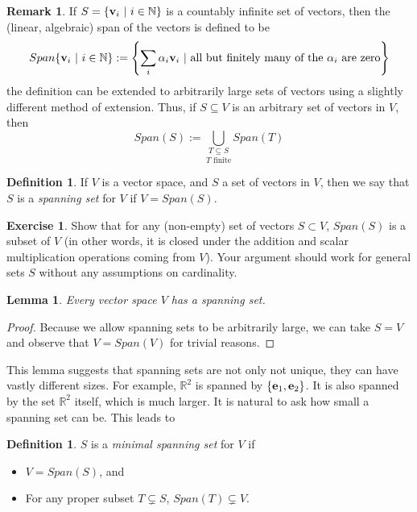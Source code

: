 \documentclass[11pt,notitlepage]{article}
\numberwithin{equation}{section}
\theoremstyle{plain}
\newtheorem{lemma}[equation]{Lemma}
\theoremstyle{definition}
\newtheorem{definition}[equation]{Definition}
\newtheorem{exercise}[equation]{Exercise}
\newtheorem{remark}[equation]{Remark}
\begin{document}
\begin{remark} If $S = \{{\bf v}_i\ |\ i\in\mathbb N\}$ is a countably infinite set of vectors, then the (linear, algebraic) span of the vectors is defined to be
\[
Span\{{\bf v}_i\ |\ i\in\mathbb N\} := \left\{\sum_i\alpha_i{\bf v}_i\ |\ \text{all but finitely many of the }\alpha_i\text{ are zero}\right\}
\]
the definition can be extended to arbitrarily large sets of vectors using a slightly different method of extension. Thus, if $S\subseteq V$ is an arbitrary set of vectors in $V$, then
\[
Span(S) := \underset{T\text{ finite}}{\underset{T\subseteq S}{\bigcup}} Span(T)
\]
\end{remark}

\begin{definition} If $V$ is a vector space, and $S$ a set of vectors in $V$, then we say that $S$ is a {\it spanning set} for $V$ if $V = Span(S)$.
\end{definition}

\begin{exercise} Show that for any (non-empty) set of vectors $S\subset V$, $Span(S)$ is a subset of $V$ (in other words, it is closed under the addition and scalar multiplication operations coming from $V$). Your argument should work for general sets $S$ without any assumptions on cardinality.
\end{exercise}

\begin{lemma} Every vector space $V$ has a spanning set.
\end{lemma}

\begin{proof} Because we allow spanning sets to be arbitrarily large, we can take $S = V$ and observe that $V = Span(V)$ for trivial reasons.
\end{proof}

This lemma suggests that spanning sets are not only not unique, they can have vastly different sizes. For example, $\mathbb R^2$ is spanned by $\{{\bf e}_1, {\bf e}_2\}$. It is also spanned by the set $\mathbb R^2$ itself, which is much larger. It is natural to ask how small a spanning set can be. This leads to

\begin{definition} $S$ is a {\it minimal spanning set} for $V$ if
\begin{itemize} 
\item $V = Span(S)$, and
\item For any proper subset $T\subsetneq S$, $Span(T)\subsetneq V$.
\end{itemize}
\end{definition}
\end{document}
